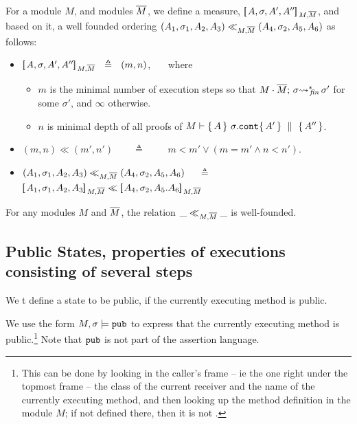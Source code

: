  \begin{definition}
\label{def:measure}
For a module $M$, and modules $\overline{M}$,   we define a measure, $[\!\![\, A, \sigma,A',A'' ]\!\!]\,_{M,\overline{M}} $, and based on it, a well founded ordering $(A_1,\sigma_1,A_2, A_3) \ll_{M,\overline{M}}  (A_4,\sigma_2,A_5,A_6)$
as follows:
\begin{itemize}
\item
 $[\!\![\, A, \sigma,A',A'' ]\!\!]\,_{M,\overline{M}} \  \ \triangleq \ \  (m, n)$,  \ \ \  where
\begin{itemize}
\item
$m$ is the minimal number of execution steps so that $ M\cdot \overline{M};\, {\sigma} {\rightsquigarrow^*}\!\!_{\mathit{fin}}\, \sigma'$  for some $\sigma'$, {and $\infty$ otherwise}.
 \item
  $n$ is minimal depth of all proofs of $M \vdash  \{\, A \, \}\ \sigma.\mbox{\normalfont{\texttt{cont}}} \{\, A' \, \} \, \,\parallel\,\, \{\, A'' \, \}  $.
\end{itemize}
 \item
 $(m,n) \ll (m',n')$\ \  \ \ $\triangleq$ \ \  \ \ $ m<m'\vee  (m=m'  \wedge n < n')   $.
\item
$(A_1,\sigma_1,A_2, A_3) \ll_{M,\overline{M}}  (A_4,\sigma_2,A_5, A_6)$  \  \  $\triangleq$ \ \ 
$\measure {A_1, \sigma_1,A_2, A_3} {M,\Mtwo}  \ll \measure {A_4, \sigma_2,A_5. A_6} {M,\Mtwo} $
\end{itemize}
\end{definition}


\begin{lemma}
\label{lemma:normal:two}
For any modules $M$ and $\overline{M}$,  the relation $\_ \ll_{M,\overline{M}}  \_$ is well-founded.
\end{lemma}


\subsection{Public States, properties of executions consisting of several steps}

We t define a state to be public, if the currently executing method is public.

\begin{definition}
We use the form
$M, \sigma \models \mbox{\normalfont{\texttt{pub}}}$ to express that the currently executing method is public.\footnote{This can be done by looking in the caller's frame -- ie the one right under the topmost frame -- the class of the current receiver and the name of the currently executing method, and then looking up the method definition in the module $M$; if not defined there, then it is not . }
Note that $\mbox{\normalfont{\texttt{pub}}}$ is not part of the assertion language.
\end{definition}

